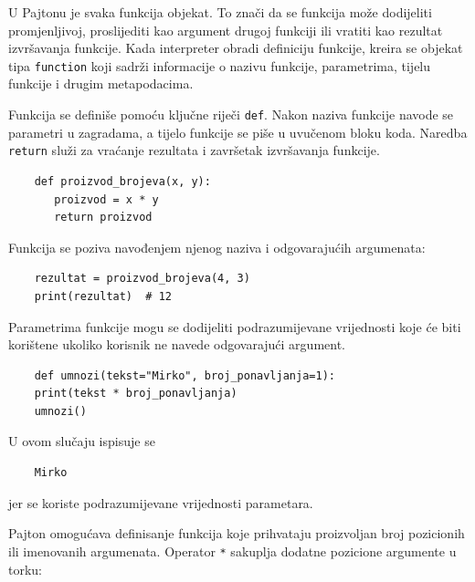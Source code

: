 U Pajtonu je svaka funkcija objekat. To znači da se funkcija može dodijeliti promjenljivoj, proslijediti kao argument drugoj funkciji ili vratiti kao rezultat izvršavanja funkcije. Kada interpreter obradi definiciju funkcije, kreira se objekat tipa \texttt{function} koji sadrži informacije o nazivu funkcije, parametrima, tijelu funkcije i drugim metapodacima.

Funkcija se definiše pomoću ključne riječi \texttt{def}. Nakon naziva funkcije navode se parametri u zagradama, a tijelo funkcije se piše u uvučenom bloku koda. Naredba \texttt{return} služi za vraćanje rezultata i završetak izvršavanja funkcije.

\begin{verbatim}
	def proizvod_brojeva(x, y):
	   proizvod = x * y
	   return proizvod
\end{verbatim}

Funkcija se poziva navođenjem njenog naziva i odgovarajućih argumenata:

\begin{verbatim}
	rezultat = proizvod_brojeva(4, 3)
	print(rezultat)  # 12
\end{verbatim}


Parametrima funkcije mogu se dodijeliti podrazumijevane vrijednosti koje će biti korištene ukoliko korisnik ne navede odgovarajući argument.

\begin{verbatim}
	def umnozi(tekst="Mirko", broj_ponavljanja=1):
	print(tekst * broj_ponavljanja)
	umnozi()
\end{verbatim}

U ovom slučaju ispisuje se

\begin{verbatim}
	Mirko
\end{verbatim}

jer se koriste podrazumijevane vrijednosti parametara.


Pajton omogućava definisanje funkcija koje prihvataju proizvoljan broj pozicionih ili imenovanih argumenata.  Operator \texttt{*} sakuplja dodatne pozicione argumente u torku:

